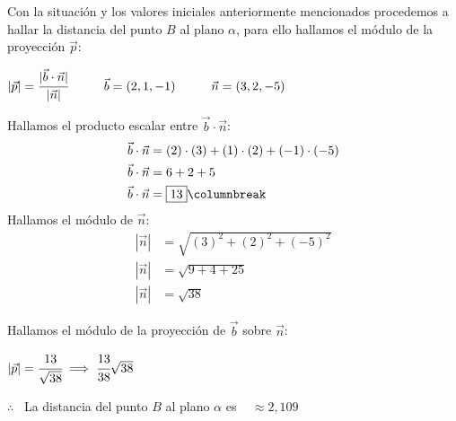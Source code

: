 \noindent Con la situación y los valores iniciales anteriormente mencionados procedemos a hallar la distancia del punto $B$ al plano $\alpha$, para ello hallamos el módulo de la proyección $\vec{p}$:
\begin{center}
	$|\vec{p}|  =\cfrac{|\vec{b} \cdot \vec{n}|}{|\vec{n}|} \hspace*{1cm} \vec{b}=(2, 1, -1) \hspace*{1cm} \vec{n}=(3, 2, -5)$
\end{center}
\begin{multicols}{2}
	\noindent Hallamos el producto escalar entre $\vec{b} \cdot \vec{n}$:
	\begin{align*}
		\vec{b} \cdot \vec{n} & = (2) \cdot (3) + (1) \cdot (2) + (-1) \cdot (-5) \\
		\vec{b} \cdot \vec{n} & = 6 + 2 + 5                                       \\
		\vec{b} \cdot \vec{n} & = \boxed{13}
		\columnbreak
	\end{align*}
	\noindent Hallamos el módulo de $\vec{n}$:
	\begin{align*}
		|\vec{n}| & = \sqrt{(3)^2 + (2)^2 + (-5)^2} \\
		|\vec{n}| & = \sqrt{9 + 4 + 25}             \\
		|\vec{n}| & = \boxed{\sqrt{38}}
	\end{align*}
\end{multicols}
\noindent Hallamos el módulo de la proyección de $\vec{b}$ sobre $\vec{n}$:

$|\vec{p}| =\cfrac{13}{\sqrt{38}} \implies \cfrac{13}{38}\sqrt{38}$

\noindent $\therefore$ \ La distancia del punto $B$ al plano $\alpha$ es \   $\approx 2,109$